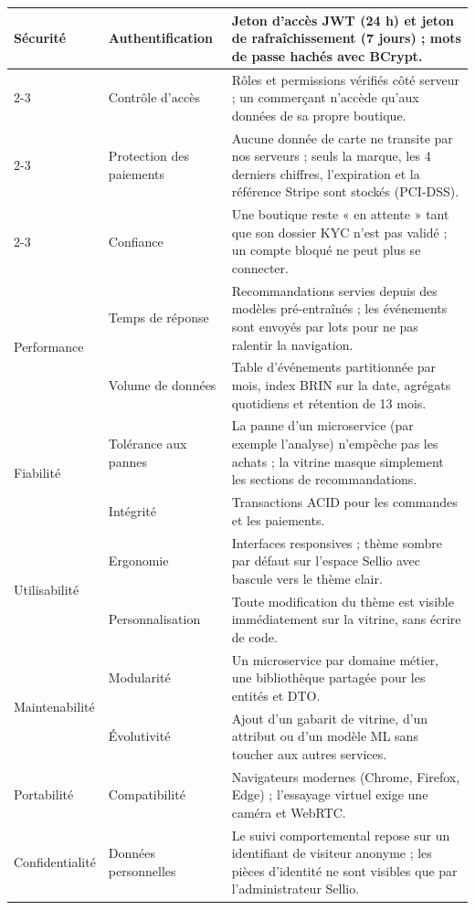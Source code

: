 \begin{longtable}{|p{3.2cm}|p{4cm}|p{8cm}|}
\multirow{4}{*}{Sécurité} & Authentification & Jeton d'accès JWT (24 h) et jeton de rafraîchissement (7 jours) ; mots de passe hachés avec BCrypt. \\
\cline{2-3}
 & Contrôle d'accès & Rôles et permissions vérifiés côté serveur ; un commerçant n'accède qu'aux données de sa propre boutique. \\
\cline{2-3}
 & Protection des paiements & Aucune donnée de carte ne transite par nos serveurs ; seuls la marque, les 4 derniers chiffres, l'expiration et la référence Stripe sont stockés (PCI-DSS). \\
\cline{2-3}
 & Confiance & Une boutique reste « en attente » tant que son dossier KYC n'est pas validé ; un compte bloqué ne peut plus se connecter. \\
\hline
\multirow{2}{*}{Performance} & Temps de réponse & Recommandations servies depuis des modèles pré-entraînés ; les événements sont envoyés par lots pour ne pas ralentir la navigation. \\
\cline{2-3}
 & Volume de données & Table d'événements partitionnée par mois, index BRIN sur la date, agrégats quotidiens et rétention de 13 mois. \\
\hline
\multirow{2}{*}{Fiabilité} & Tolérance aux pannes & La panne d'un microservice (par exemple l'analyse) n'empêche pas les achats ; la vitrine masque simplement les sections de recommandations. \\
\cline{2-3}
 & Intégrité & Transactions ACID pour les commandes et les paiements. \\
\hline
\multirow{2}{*}{Utilisabilité} & Ergonomie & Interfaces responsives ; thème sombre par défaut sur l'espace Sellio avec bascule vers le thème clair. \\
\cline{2-3}
 & Personnalisation & Toute modification du thème est visible immédiatement sur la vitrine, sans écrire de code. \\
\hline
\multirow{2}{*}{Maintenabilité} & Modularité & Un microservice par domaine métier, une bibliothèque partagée pour les entités et DTO. \\
\cline{2-3}
 & Évolutivité & Ajout d'un gabarit de vitrine, d'un attribut ou d'un modèle ML sans toucher aux autres services. \\
\hline
Portabilité & Compatibilité & Navigateurs modernes (Chrome, Firefox, Edge) ; l'essayage virtuel exige une caméra et WebRTC. \\
\hline
Confidentialité & Données personnelles & Le suivi comportemental repose sur un identifiant de visiteur anonyme ; les pièces d'identité ne sont visibles que par l'administrateur Sellio. \\
\hline
\end{longtable}

